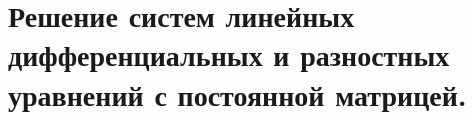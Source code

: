 \documentclass[../../calc-math-exam-2023.tex]{subfiles}
\begin{document}
    \section{Решение систем линейных дифференциальных и разностных уравнений с постоянной матрицей.}\label{sec:ch18}
\end{document}
